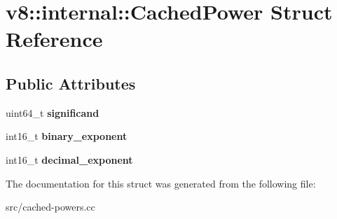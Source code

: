 \hypertarget{structv8_1_1internal_1_1_cached_power}{}\section{v8\+:\+:internal\+:\+:Cached\+Power Struct Reference}
\label{structv8_1_1internal_1_1_cached_power}
\subsection*{Public Attributes}
\begin{DoxyCompactItemize}
\item 
\hypertarget{structv8_1_1internal_1_1_cached_power_a36c4e942b0d8b3c5b7905d31781f5622}{}uint64\+\_\+t {\bfseries significand}\label{structv8_1_1internal_1_1_cached_power_a36c4e942b0d8b3c5b7905d31781f5622}

\item 
\hypertarget{structv8_1_1internal_1_1_cached_power_a6259fc585c893b3372cbc393de4d73ad}{}int16\+\_\+t {\bfseries binary\+\_\+exponent}\label{structv8_1_1internal_1_1_cached_power_a6259fc585c893b3372cbc393de4d73ad}

\item 
\hypertarget{structv8_1_1internal_1_1_cached_power_af8c120ffc417e47e2cc809b8beea2c6f}{}int16\+\_\+t {\bfseries decimal\+\_\+exponent}\label{structv8_1_1internal_1_1_cached_power_af8c120ffc417e47e2cc809b8beea2c6f}

\end{DoxyCompactItemize}


The documentation for this struct was generated from the following file\+:\begin{DoxyCompactItemize}
\item 
src/cached-\/powers.\+cc\end{DoxyCompactItemize}
